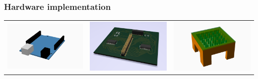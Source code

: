 \documentclass{beamer}
\begin{document}
\begin{frame}
    \frametitle{Hardware implementation}
    \begin{center}
        \begin{tabular}{ccc}
            \includegraphics[width=.33\textwidth]{img/arduino.png}&
            \includegraphics[width=.33\textwidth]{img/board.png}&
            \includegraphics[width=.33\textwidth]{img/foam_table.png}
        \end{tabular}
    \end{center}

\end{frame}
\end{document}
